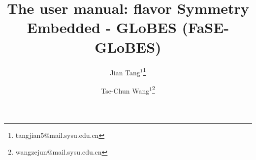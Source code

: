 \documentclass[aps,prd,nofootinbib,preprint]{revtex4}
\begin{document}
 
\title{\Large The user manual: flavor Symmetry Embedded - GLoBES (FaSE-GLoBES)} %
\author{Jian Tang$^1$\footnote{tangjian5@mail.sysu.edu.cn}}
\author{Tse-Chun Wang$^1$\footnote{wangzejun@mail.sysu.edu.cn}}


\maketitle

\end{document}
